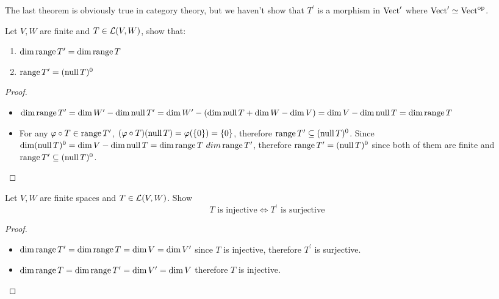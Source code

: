 \documentclass[../main.tex]{subfiles}
\begin{document}
The last theorem is obviously true in category theory, but we haven't show that
$T^\prime$ is a morphism in $\textnormal{Vect}^\prime$ where $\textnormal{Vect}^\prime \simeq \textnormal{Vect}^{\textnormal{op}}$.

\begin{theorem}
  Let $V, W$ are finite and $T \in \mathcal{L}(V, W)$, show that:
  \begin{enumerate}
    \item $\dim \operatorname{range} T^\prime = \dim \operatorname{range} T$
    \item $\operatorname{range} T^\prime = (\operatorname{null} T)^0$
  \end{enumerate}
\end{theorem}
\begin{proof}
  ~
  \begin{itemize}
    \item $\dim \operatorname{range} T^\prime = \dim W^\prime - \dim \operatorname{null} T^\prime = \dim W^\prime - (\dim \operatorname{null} T + \dim W - \dim V) = \dim V - \dim \operatorname{null} T = \dim \operatorname{range} T$
    \item For any $\varphi \circ T \in \operatorname{range} T^\prime$, $(\varphi \circ T)(\operatorname{null} T) = \varphi(\{0\}) = \{0\}$, therefore $\operatorname{range} T^\prime \subseteq (\operatorname{null} T)^0$.
          Since $\dim (\operatorname{null} T)^0 = \dim V - \dim \operatorname{null} T = \dim \operatorname{range} T \ dim \operatorname{range} T^\prime$,
          therefore $\operatorname{range} T^\prime = (\operatorname{null} T)^0$ since both of them are finite and $\operatorname{range} T^\prime \subseteq (\operatorname{null} T)^0$.
  \end{itemize}
\end{proof}

\begin{theorem}
  Let $V, W$ are finite spaces and $T \in \mathcal{L}(V, W)$. Show
  \[
  T \text{ is injective} \iff T^\prime \text{ is surjective}
  \]
\end{theorem}
\begin{proof}
  ~
  \begin{itemize}
    \item $\dim \operatorname{range} T^\prime = \dim \operatorname{range} T = \dim V = \dim V^\prime$ since $T$ is injective, therefore $T^\prime$ is surjective.
    \item $\dim \operatorname{range} T = \dim \operatorname{range} T^\prime = \dim V^\prime = \dim V$ therefore $T$ is injective.
  \end{itemize}
\end{proof}
\end{document}
